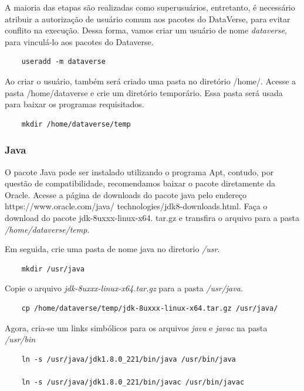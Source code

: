 \documentclass[12pt,hidelinks]{article}
\begin{document}
            
            A maioria das etapas são realizadas como superusuários, entretanto, é necessário atribuir a autorização de usuário comum aos pacotes do DataVerse, para evitar conflito na execução. Dessa forma, vamos criar um usuário de nome \textit{dataverse}, para vinculá-lo aos pacotes do Dataverse.

            \begin{verbatim}
    useradd -m dataverse
            \end{verbatim}
            
            Ao criar o usuário, também será criado uma pasta no diretório /home/. Acesse a pasta /home/dataverse e crie um diretório temporário. Essa pasta será usada para baixar os programas requisitados.
            
            \begin{verbatim}
    mkdir /home/dataverse/temp
            \end{verbatim}
            

        \subsubsection{Java}
            
             \qquad O pacote Java pode ser instalado utilizando o programa Apt, contudo, por questão de compatibilidade, recomendamos baixar o pacote diretamente da Oracle. Acesse a página de downloads do pacote java pelo endereço https://www.oracle.com/java/
             technologies/jdk8-downloads.html. Faça o download do pacote jdk-8uxxx-linux-x64.
             tar.gz e transfira o arquivo para a pasta \textit{/home/dataverse/temp}.
             
            Em seguida, crie uma pasta de nome java no diretorio \textit{/usr}.
            \begin{verbatim}
    mkdir /usr/java
            \end{verbatim}
            
            Copie o arquivo \textit{jdk-8uxxx-linux-x64.tar.gz} para a pasta \textit{/usr/java}.
            \begin{verbatim}
    cp /home/dataverse/temp/jdk-8uxxx-linux-x64.tar.gz /usr/java/
            \end{verbatim}
            
            Agora, cria-se um links simbólicos para os arquivos \textit{java} e \textit{javac} na pasta \textit{/usr/bin}
            \begin{verbatim}
    ln -s /usr/java/jdk1.8.0_221/bin/java /usr/bin/java
    
    ln -s /usr/java/jdk1.8.0_221/bin/javac /usr/bin/javac
            \end{verbatim}
            
\end{document}
